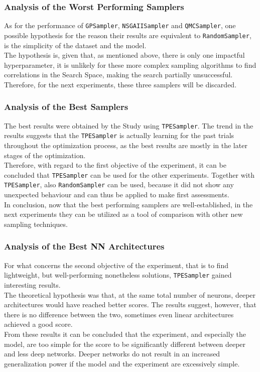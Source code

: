\subsubsection{Analysis of the Worst Performing Samplers}

As for the performance of \texttt{GPSampler}, \texttt{NSGAIISampler} and \texttt{QMCSampler}, one possible hypothesis for the reason their results are equivalent to \texttt{RandomSampler}, is the simplicity of the dataset and the model.
\\[0.3cm]The hypothesis is, given that, as mentioned above, there is only one impactful hyperparameter, it is unlikely for these more complex sampling algorithms to find correlations in the Search Space, making the search partially unsuccessful.
Therefore, for the next experiments, these three samplers will be discarded.

\subsubsection{Analysis of the Best Samplers}

The best results were obtained by the Study using \texttt{TPESampler}. The trend in the results suggests that the \texttt{TPESampler} is actually learning for the past trials throughout the optimization process, as the best results are mostly in the later stages of the optimization.
\\[0.3cm]Therefore, with regard to the first objective of the experiment, it can be concluded that \texttt{TPESampler} can be used for the other experiments. Together with \texttt{TPESampler}, also \texttt{RandomSampler} can be used, because it did not show any unexpected behaviour and can thus be applied to make first assessments.
\\[0.3cm]In conclusion, now that the best performing samplers are well-established, in the next experiments they can be utilized as a tool of comparison with other new sampling techniques. 

\subsubsection{Analysis of the Best NN Architectures}

For what concerns the second objective of the experiment, that is to find lightweight, but well-performing nonetheless solutions, \texttt{TPESampler} gained interesting results.
\\[0.3cm]The theoretical hypothesis was that, at the same total number of neurons, deeper architectures would have reached better scores. The results suggest, however, that there is no difference between the two, sometimes even linear architectures achieved a good score.
\\[0.3cm]From these results it can be concluded that the experiment, and especially the model, are too simple for the score to be significantly different between deeper and less deep networks. Deeper networks do not result in an increased generalization power if the model and the experiment are excessively simple.

